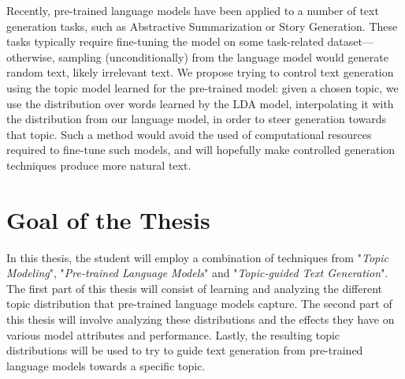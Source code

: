 \documentclass{article}
\begin{document}
Recently, pre-trained language models have been applied to a number of text generation tasks, such as Abstractive Summarization or Story Generation. These tasks typically require fine-tuning the model on some task-related dataset---otherwise, sampling (unconditionally) from the language model would generate random text, likely irrelevant text. We propose trying to control text generation using the topic model learned for the pre-trained model: given a chosen topic, we use the distribution over words learned by the LDA model, interpolating it with the distribution from our language model, in order to steer generation towards that topic. Such a method would avoid the used of computational resources required to fine-tune such models, and will hopefully make controlled generation techniques produce more natural text.

\section{Goal of the Thesis}
In this thesis, the student will employ a combination of techniques from "\textit{Topic Modeling}", "\textit{Pre-trained Language Models}" and "\textit{Topic-guided Text Generation}". The first part of this thesis will consist of learning and analyzing the different topic distribution that pre-trained language models capture. The second part of this thesis will involve analyzing these distributions and the effects they have on various model attributes and performance. Lastly, the resulting topic distributions will be used to try to guide text generation from pre-trained language models towards a specific topic.
\end{document}
